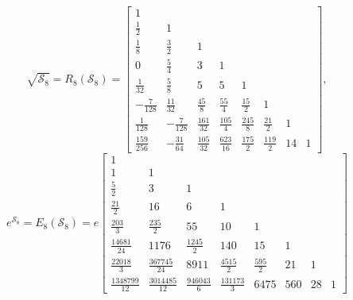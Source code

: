 \begin{example}
\begin{displaymath}
\sqrt{\mathcal{S}_{8}} = {R_{ 8 }}{\left (\mathcal{S}_{ 8 } \right )} = \left[\begin{matrix}1 &  &  &  &  &  &  & \\\frac{1}{2} & 1 &  &  &  &  &  & \\\frac{1}{8} & \frac{3}{2} & 1 &  &  &  &  & \\0 & \frac{5}{4} & 3 & 1 &  &  &  & \\\frac{1}{32} & \frac{5}{8} & 5 & 5 & 1 &  &  & \\- \frac{7}{128} & \frac{11}{32} & \frac{45}{8} & \frac{55}{4} & \frac{15}{2} & 1 &  & \\\frac{1}{128} & - \frac{7}{128} & \frac{161}{32} & \frac{105}{4} & \frac{245}{8} & \frac{21}{2} & 1 & \\\frac{159}{256} & - \frac{31}{64} & \frac{105}{32} & \frac{623}{16} & \frac{175}{2} & \frac{119}{2} & 14 & 1\end{matrix}\right],
\end{displaymath}
\begin{displaymath}
e^{\mathcal{S}_{8}} = E_{8}\left( \mathcal{S}_{8}\right) = e \left[\begin{matrix}1 &  &  &  &  &  &  & \\1 & 1 &  &  &  &  &  & \\\frac{5}{2} & 3 & 1 &  &  &  &  & \\\frac{21}{2} & 16 & 6 & 1 &  &  &  & \\\frac{203}{3} & \frac{235}{2} & 55 & 10 & 1 &  &  & \\\frac{14681}{24} & 1176 & \frac{1245}{2} & 140 & 15 & 1 &  & \\\frac{22018}{3} & \frac{367745}{24} & 8911 & \frac{4515}{2} & \frac{595}{2} & 21 & 1 & \\\frac{1348799}{12} & \frac{3014485}{12} & \frac{946043}{6} & \frac{131173}{3} & 6475 & 560 & 28 & 1\end{matrix}\right]

\end{displaymath}
\end{example}
